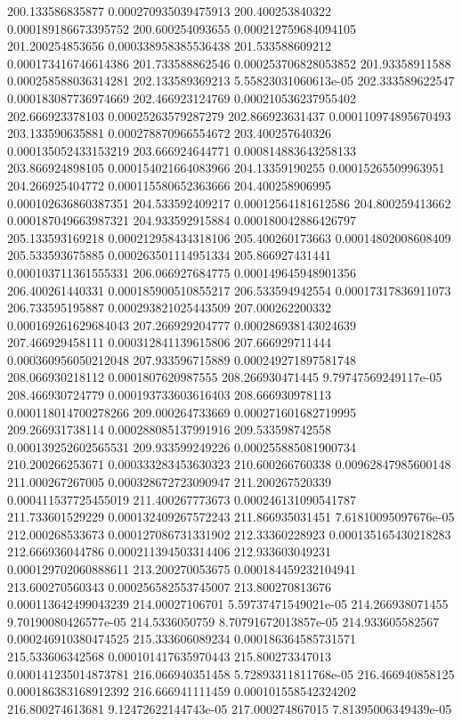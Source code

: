 {200.133586835877 0.000270935039475913
200.400253840322 0.000189186673395752
200.600254093655 0.000212759684094105
201.200254853656 0.000338958385536438
201.533588609212 0.000173416746614386
201.733588862546 0.000253706828053852
201.93358911588 0.000258588036314281
202.133589369213 5.55823031060613e-05
202.333589622547 0.000183087736974669
202.466923124769 0.000210536237955402
202.666923378103 0.00025263579287279
202.866923631437 0.000110974895670493
203.133590635881 0.000278870966554672
203.400257640326 0.000135052433153219
203.666924644771 0.000814883643258133
203.866924898105 0.000154021664083966
204.13359190255 0.00015265509963951
204.266925404772 0.000115580652363666
204.400258906995 0.000102636860387351
204.533592409217 0.00012564181612586
204.800259413662 0.000187049663987321
204.933592915884 0.000180042886426797
205.133593169218 0.000212958434318106
205.400260173663 0.00014802008608409
205.533593675885 0.000263501114951334
205.866927431441 0.000103711361555331
206.066927684775 0.000149645948901356
206.400261440331 0.000185900510855217
206.533594942554 0.00017317836911073
206.733595195887 0.000293821025443509
207.000262200332 0.000169261629684043
207.266929204777 0.000286938143024639
207.466929458111 0.000312841139615806
207.666929711444 0.000360956050212048
207.933596715889 0.000249271897581748
208.066930218112 0.0001807620987555
208.266930471445 9.79747569249117e-05
208.466930724779 0.000193733603616403
208.666930978113 0.000118014700278266
209.000264733669 0.000271601682719995
209.266931738114 0.000288085137991916
209.533598742558 0.000139252602565531
209.933599249226 0.000255885081900734
210.200266253671 0.000333283453630323
210.600266760338 0.00962847985600148
211.000267267005 0.000328672723090947
211.200267520339 0.000411537725455019
211.400267773673 0.000246131090541787
211.733601529229 0.000132409267572243
211.866935031451 7.61810095097676e-05
212.000268533673 0.000127086731331902
212.33360228923 0.000135165430218283
212.666936044786 0.000211394503314406
212.933603049231 0.000129702060888611
213.200270053675 0.000184459232104941
213.600270560343 0.000256582553745007
213.800270813676 0.000113642499043239
214.00027106701 5.59737471549021e-05
214.266938071455 9.70190080426577e-05
214.5336050759 8.70791672013857e-05
214.933605582567 0.000246910380474525
215.333606089234 0.000186364585731571
215.533606342568 0.000101417635970443
215.800273347013 0.000141235014873781
216.066940351458 5.72893311811768e-05
216.466940858125 0.000186383168912392
216.666941111459 0.000101558542324202
216.800274613681 9.12472622144743e-05
217.000274867015 7.81395006349439e-05
}
